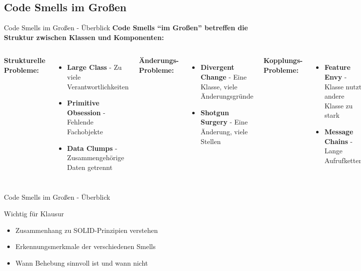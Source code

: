 
\subsection{Code Smells im Großen}

\begin{frame}{Code Smells im Großen - Überblick}
  \textbf{Code Smells ``im Großen'' betreffen die Struktur zwischen Klassen und Komponenten:}
  \begin{columns}[T]
    \textbf{Strukturelle Probleme:}
    \begin{itemize}
      \item \textbf{Large Class} - Zu viele Verantwortlichkeiten
      \item \textbf{Primitive Obsession} - Fehlende Fachobjekte
      \item \textbf{Data Clumps} - Zusammengehörige Daten getrennt
    \end{itemize}
    \textbf{Änderungs-Probleme:}
    \begin{itemize}
      \item \textbf{Divergent Change} - Eine Klasse, viele Änderungsgründe
      \item \textbf{Shotgun Surgery} - Eine Änderung, viele Stellen
    \end{itemize}
    \textbf{Kopplungs-Probleme:}
    \begin{itemize}
      \item \textbf{Feature Envy} - Klasse nutzt andere Klasse zu stark
      \item \textbf{Message Chains} - Lange Aufrufketten
    \end{itemize}
  \end{columns}
\end{frame}

\begin{frame}{Code Smells im Großen - Überblick}
  \begin{alertblock}{Wichtig für Klausur}
    \begin{itemize}
      \item Zusammenhang zu SOLID-Prinzipien verstehen
      \item Erkennungsmerkmale der verschiedenen Smells
      \item Wann Behebung sinnvoll ist und wann nicht
    \end{itemize}
  \end{alertblock}
\end{frame}


